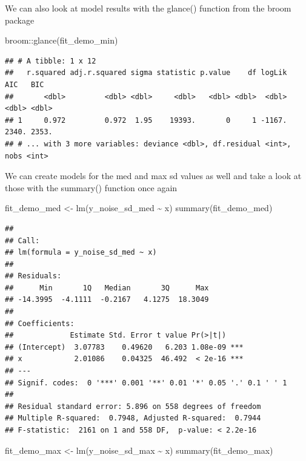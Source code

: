 \documentclass[
]{book}
\newenvironment{Shaded}{\begin{snugshade}}{\end{snugshade}}
\newcommand{\FunctionTok}[1]{\textcolor[rgb]{0.00,0.00,0.00}{#1}}
\newcommand{\NormalTok}[1]{#1}
\newcommand{\OtherTok}[1]{\textcolor[rgb]{0.56,0.35,0.01}{#1}}
\newcommand{\SpecialCharTok}[1]{\textcolor[rgb]{0.00,0.00,0.00}{#1}}
\begin{document}
We can also look at model results with the glance() function from the broom package

\begin{Shaded}
\begin{Highlighting}[]
\NormalTok{broom}\SpecialCharTok{::}\FunctionTok{glance}\NormalTok{(fit\_demo\_min)}
\end{Highlighting}
\end{Shaded}

\begin{verbatim}
## # A tibble: 1 x 12
##   r.squared adj.r.squared sigma statistic p.value    df logLik   AIC   BIC
##       <dbl>         <dbl> <dbl>     <dbl>   <dbl> <dbl>  <dbl> <dbl> <dbl>
## 1     0.972         0.972  1.95    19393.       0     1 -1167. 2340. 2353.
## # ... with 3 more variables: deviance <dbl>, df.residual <int>, nobs <int>
\end{verbatim}

We can create models for the med and max sd values as well and take a look at those with the summary() function once again

\begin{Shaded}
\begin{Highlighting}[]
\NormalTok{fit\_demo\_med }\OtherTok{\textless{}{-}} \FunctionTok{lm}\NormalTok{(y\_noise\_sd\_med }\SpecialCharTok{\textasciitilde{}}\NormalTok{ x)}
\FunctionTok{summary}\NormalTok{(fit\_demo\_med)}
\end{Highlighting}
\end{Shaded}

\begin{verbatim}
## 
## Call:
## lm(formula = y_noise_sd_med ~ x)
## 
## Residuals:
##      Min       1Q   Median       3Q      Max 
## -14.3995  -4.1111  -0.2167   4.1275  18.3049 
## 
## Coefficients:
##             Estimate Std. Error t value Pr(>|t|)    
## (Intercept)  3.07783    0.49620   6.203 1.08e-09 ***
## x            2.01086    0.04325  46.492  < 2e-16 ***
## ---
## Signif. codes:  0 '***' 0.001 '**' 0.01 '*' 0.05 '.' 0.1 ' ' 1
## 
## Residual standard error: 5.896 on 558 degrees of freedom
## Multiple R-squared:  0.7948, Adjusted R-squared:  0.7944 
## F-statistic:  2161 on 1 and 558 DF,  p-value: < 2.2e-16
\end{verbatim}

\begin{Shaded}
\begin{Highlighting}[]
\NormalTok{fit\_demo\_max }\OtherTok{\textless{}{-}} \FunctionTok{lm}\NormalTok{(y\_noise\_sd\_max }\SpecialCharTok{\textasciitilde{}}\NormalTok{ x)}
\FunctionTok{summary}\NormalTok{(fit\_demo\_max)}
\end{Highlighting}
\end{Shaded}
\end{document}
